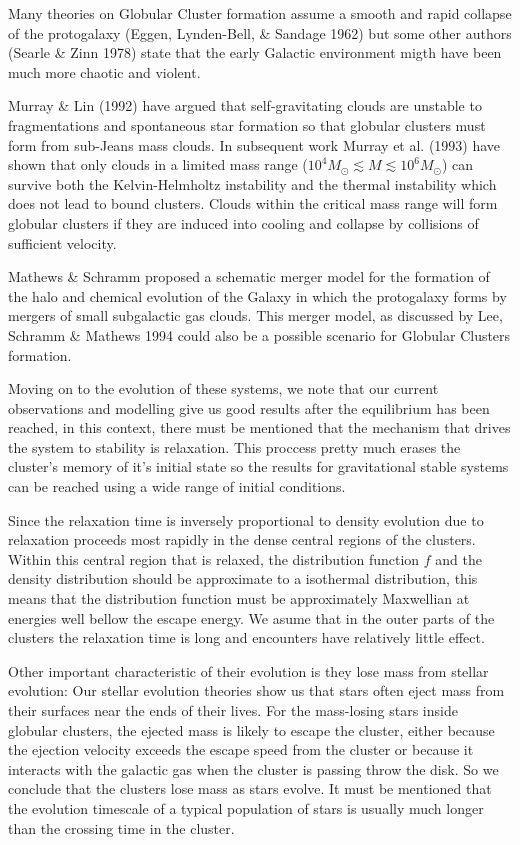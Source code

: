 Many theories on Globular Cluster formation assume a smooth and rapid collapse of the protogalaxy (Eggen, Lynden-Bell, \& Sandage 1962) but some other authors (Searle \& Zinn 1978) state that the early Galactic environment migth have been much more chaotic and violent.

Murray \& Lin (1992) have argued that self-gravitating clouds are unstable to fragmentations and spontaneous star formation so that globular clusters must form from sub-Jeans mass clouds. In subsequent work Murray et al. (1993) have shown that only clouds in a limited mass range ($10^{4}M_\odot\lesssim M\lesssim 10^{6}M_\odot$) can survive both the Kelvin-Helmholtz  instability and the thermal instability which does not lead to bound clusters. Clouds within the critical mass range will form globular clusters if they are induced into cooling and collapse by collisions of sufficient velocity.

Mathews \& Schramm proposed a schematic merger model for the formation of the halo and chemical evolution of the Galaxy in which the protogalaxy forms by mergers of small subgalactic gas clouds. This merger model, as discussed by Lee, Schramm \& Mathews 1994 could also be a possible scenario for Globular Clusters formation. 

Moving on to the evolution of these systems, we note that our current observations and modelling give us good results after the equilibrium has been reached, in this context, there must be mentioned that the mechanism that drives the system to stability is relaxation. This proccess pretty much erases the cluster's memory of it's initial state so the results for gravitational stable systems can be reached using a wide range of initial conditions.

Since the relaxation time is inversely proportional to density evolution due to relaxation proceeds most rapidly in the dense central regions of the clusters. Within this central region that is relaxed, the distribution function $f$ and the density distribution should be approximate to a isothermal distribution, this means that the distribution function must be approximately Maxwellian at energies well bellow the escape energy. We asume that in the outer parts of the clusters the relaxation time is long and encounters have relatively little effect.

Other important characteristic of their evolution is they lose mass from stellar evolution: Our stellar evolution theories show us that stars often eject mass from their surfaces near the ends of their lives. For the mass-losing stars inside globular clusters, the ejected mass is likely to escape the cluster, either because the ejection velocity exceeds the escape speed from the cluster or because it interacts with the galactic gas when the cluster is passing throw the disk. So we conclude that the clusters lose mass as stars evolve. It must be mentioned that the evolution timescale of a typical population of stars is usually much longer than the crossing time in the cluster.

